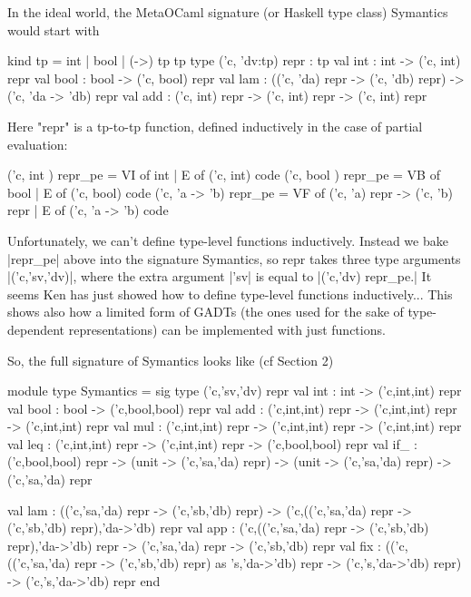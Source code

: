 \documentclass[preprint]{sigplanconf}
\begin{document}
In the ideal world, the MetaOCaml signature (or Haskell type class)
Symantics would start with
\begin{code}
    kind tp = int | bool | (->) tp tp
    type ('c, 'dv:tp) repr : tp
    val int : int -> ('c, int) repr
    val bool : bool -> ('c, bool) repr
    val lam : (('c, 'da) repr -> ('c, 'db) repr) -> ('c, 'da -> 'db) repr
    val add : ('c, int) repr -> ('c, int) repr -> ('c, int) repr
\end{code}

Here "repr" is a tp-to-tp function, defined inductively in the case of
partial evaluation:

\begin{code}
    ('c, int     ) repr_pe = VI of int
                           | E of ('c, int) code
    ('c, bool    ) repr_pe = VB of bool
                           | E of ('c, bool) code
    ('c, 'a -> 'b) repr_pe = VF of ('c, 'a) repr -> ('c, 'b) repr
                           | E of ('c, 'a -> 'b) code
\end{code}

Unfortunately, we can't define type-level functions inductively.
Instead we bake |repr_pe| above into the signature Symantics, so repr
takes three type arguments |('c,'sv,'dv)|, where the extra argument 
|'sv| is equal to |('c,'dv) repr_pe.|
It seems Ken has just showed how to define type-level functions
inductively... This shows also how a limited form of GADTs (the ones
used for the sake of type-dependent representations) can be
implemented with just functions. 

So, the full signature of Symantics looks like (cf Section 2)

\begin{code}
module type Symantics = sig
  type ('c,'sv,'dv) repr
  val int  : int  -> ('c,int,int) repr
  val bool : bool -> ('c,bool,bool) repr
  val add  : ('c,int,int) repr -> ('c,int,int) repr -> ('c,int,int) repr
  val mul  : ('c,int,int) repr -> ('c,int,int) repr -> ('c,int,int) repr
  val leq  : ('c,int,int) repr -> ('c,int,int) repr -> ('c,bool,bool) repr
  val if_ : ('c,bool,bool) repr ->
             (unit -> ('c,'sa,'da) repr) ->
             (unit -> ('c,'sa,'da) repr) -> ('c,'sa,'da) repr 

  val lam : (('c,'sa,'da) repr -> ('c,'sb,'db) repr)
    -> ('c,(('c,'sa,'da) repr -> ('c,'sb,'db) repr),'da->'db) repr
  val app : ('c,(('c,'sa,'da) repr -> ('c,'sb,'db) repr),'da->'db) repr
    -> ('c,'sa,'da) repr -> ('c,'sb,'db) repr
  val fix : (('c,(('c,'sa,'da) repr -> ('c,'sb,'db) repr) as 's,'da->'db) repr 
             -> ('c,'s,'da->'db) repr)  -> ('c,'s,'da->'db) repr
end
\end{code}
\end{document}
